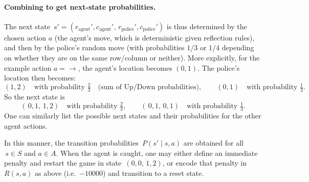 \begin{enumerate}
    \paragraph{Combining to get next-state probabilities.}
    The next state
    \(\,s' = (r_{\text{agent}}', c_{\text{agent}}',\,r_{\text{police}}', c_{\text{police}}')\)
    is thus determined by the chosen action \(a\) (the agent's move, which is deterministic given reflection rules), and then by the police's random move (with probabilities \(1/3\) or \(1/4\) depending on whether they are on the same row/column or neither).  More explicitly, for the example action \(a = \rightarrow\), the agent's location becomes \((0,1)\).  The police's location then becomes:
    \[
      (1,2) \quad \text{with probability } \tfrac23 \quad \text{(sum of Up/Down probabilities)},
      \quad\quad
      (0,1) \quad \text{with probability } \tfrac13.
    \]
    So the next state is
    \[
      (\,0,1,\,1,2) \quad \text{with probability } \tfrac23, 
      \qquad
      (\,0,1,\,0,1) \quad \text{with probability } \tfrac13.
    \]
    One can similarly list the possible next states and their probabilities for the other agent actions.

    In this manner, the transition probabilities 
    \(\,P(s' \mid s,a)\) 
    are obtained for all \(\,s\in S\) and \(a\in A\).  When the agent is caught, one may either define an immediate penalty and restart the game in state \(\,(0,0,\,1,2)\), or encode that penalty in \(R(s,a)\) as above (i.e.\ \(-10000\)) and transition to a reset state.

\end{enumerate}